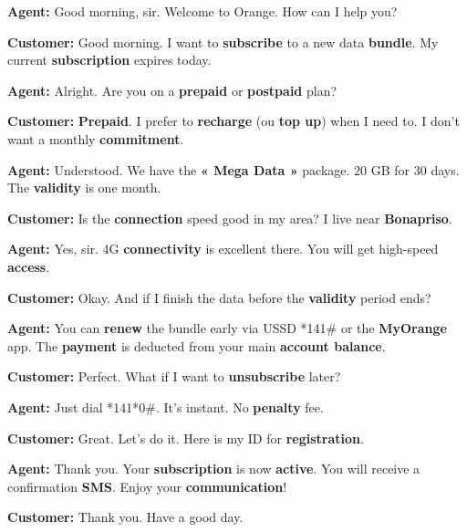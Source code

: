 \documentclass[11pt]{article}
\begin{document}
\begin{textebox}
\textbf{Agent:} Good morning, sir. Welcome to Orange. How can I help you?

\textbf{Customer:} Good morning. I want to \textbf{subscribe} to a new data \textbf{bundle}. My current \textbf{subscription} expires today.

\textbf{Agent:} Alright. Are you on a \textbf{prepaid} or \textbf{postpaid} plan?

\textbf{Customer:} \textbf{Prepaid}. I prefer to \textbf{recharge} (ou \textbf{top up}) when I need to. I don't want a monthly \textbf{commitment}.

\textbf{Agent:} Understood. We have the \textbf{« Mega Data »} package. 20 GB for 30 days. The \textbf{validity} is one month.

\textbf{Customer:} Is the \textbf{connection} speed good in my area? I live near \textbf{Bonapriso}.

\textbf{Agent:} Yes, sir. 4G \textbf{connectivity} is excellent there. You will get high-speed \textbf{access}.

\textbf{Customer:} Okay. And if I finish the data before the \textbf{validity} period ends?

\textbf{Agent:} You can \textbf{renew} the bundle early via USSD *141\# or the \textbf{MyOrange} app. The \textbf{payment} is deducted from your main \textbf{account balance}.

\textbf{Customer:} Perfect. What if I want to \textbf{unsubscribe} later?

\textbf{Agent:} Just dial *141*0\#. It's instant. No \textbf{penalty} fee.

\textbf{Customer:} Great. Let's do it. Here is my ID for \textbf{registration}.

\textbf{Agent:} Thank you. Your \textbf{subscription} is now \textbf{active}. You will receive a confirmation \textbf{SMS}. Enjoy your \textbf{communication}!

\textbf{Customer:} Thank you. Have a good day.
\end{textebox}
\end{document}

